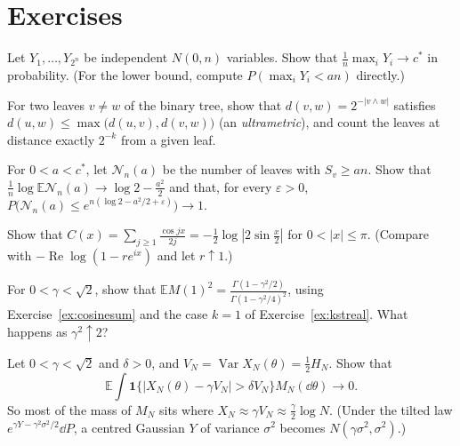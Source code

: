 \section{Exercises}

\begin{exercise}[$\star$]\label{ex:indepmax}
Let $Y_1,\dots,Y_{2^n}$ be independent $N(0,n)$ variables. Show that $\frac1n\max_iY_i\to c^*$ in probability. (For the lower bound, compute $P(\max_iY_i<an)$ directly.)
\end{exercise}

\begin{exercise}[$\star$]\label{ex:ultrametric}
For two leaves $v\ne w$ of the binary tree, show that $d(v,w)=2^{-|v\wedge w|}$ satisfies $d(u,w)\le\max\bigl(d(u,v),d(v,w)\bigr)$ (an \emph{ultrametric}), and count the leaves at distance exactly $2^{-k}$ from a given leaf.
\end{exercise}

\begin{exercise}[$\star\star$]\label{ex:thickcount}
For $0<a<c^*$, let $\mathcal N_n(a)$ be the number of leaves with $S_v\ge an$. Show that $\frac1n\log\mathbb E\mathcal N_n(a)\to\log2-\frac{a^2}2$ and that, for every $\varepsilon>0$, $P\bigl(\mathcal N_n(a)\le e^{n(\log2-a^2/2+\varepsilon)}\bigr)\to1$.
\end{exercise}

\begin{exercise}[$\star\star$]\label{ex:cosinesum}
Show that $C(x)=\sum_{j\ge1}\frac{\cos jx}{2j}=-\frac12\log|2\sin\frac x2|$ for $0<|x|\le\pi$. (Compare with $-\operatorname{Re}\log(1-re^{ix})$ and let $r\uparrow1$.)
\end{exercise}

\begin{exercise}[$\star\star$]\label{ex:gmcmass}
For $0<\gamma<\sqrt2$, show that $\mathbb EM(1)^2=\frac{\Gamma(1-\gamma^2/2)}{\Gamma(1-\gamma^2/4)^2}$, using Exercise~\ref{ex:cosinesum} and the case $k=1$ of Exercise~\ref{ex:kstreal}. What happens as $\gamma^2\uparrow2$?
\end{exercise}

\begin{exercise}[$\star\star$]\label{ex:thickchaos}
Let $0<\gamma<\sqrt2$ and $\delta>0$, and $V_N=\operatorname{Var}X_N(\theta)=\frac12H_N$. Show that
\[
\mathbb E\int\mathbf 1\bigl\{|X_N(\theta)-\gamma V_N|>\delta V_N\bigr\}M_N(\dd\theta)\longrightarrow0 .
\]
So most of the mass of $M_N$ sits where $X_N\approx\gamma V_N\approx\frac\gamma2\log N$. (Under the tilted law $e^{\gamma Y-\gamma^2\sigma^2/2}\dd P$, a centred Gaussian $Y$ of variance $\sigma^2$ becomes $N(\gamma\sigma^2,\sigma^2)$.)
\end{exercise}

